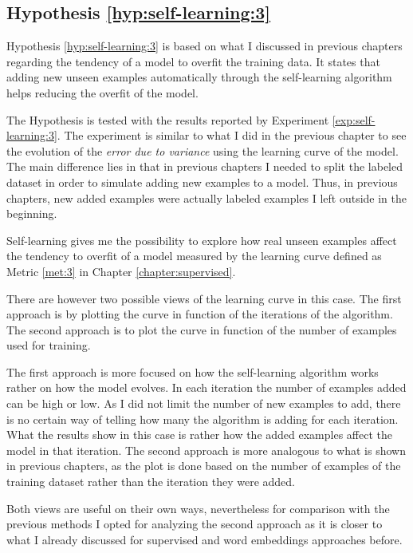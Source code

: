 \subsection{Hypothesis \ref{hyp:self-learning:3}}\label{sec:self-learning:hyp:3}

Hypothesis \ref{hyp:self-learning:3} is based on what I discussed in previous
chapters regarding the tendency of a model to overfit the training data. It
states that adding new unseen examples automatically through the self-learning
algorithm helps reducing the overfit of the model.

The Hypothesis is tested with the results reported by Experiment
\ref{exp:self-learning:3}. The experiment is similar to what I did in the
previous chapter to see the evolution of the {\em error due to variance} using
the learning curve of the model. The main difference lies in that in previous
chapters I needed to split the labeled dataset in order to simulate adding new
examples to a model. Thus, in previous chapters, new added examples were
actually labeled examples I left outside in the beginning.

Self-learning gives me the possibility to explore how real unseen examples
affect the tendency to overfit of a model measured by the learning curve
defined as Metric \ref{met:3} in Chapter \ref{chapter:supervised}.

There are however two possible views of the learning curve in this case. The
first approach is by plotting the curve in function of the iterations of the
algorithm. The second approach is to plot the curve in function of the number
of examples used for training.

The first approach is more focused on how the self-learning algorithm works
rather on how the model evolves. In each iteration the number of examples added
can be high or low. As I did not limit the number of new examples to add, there
is no certain way of telling how many the algorithm is adding for each
iteration. What the results show in this case is rather how the added examples
affect the model in that iteration. The second approach is more analogous to
what is shown in previous chapters, as the plot is done based on the number of
examples of the training dataset rather than the iteration they were added.

Both views are useful on their own ways, nevertheless for comparison with the
previous methods I opted for analyzing the second approach as it is closer to
what I already discussed for supervised and word embeddings approaches before.

